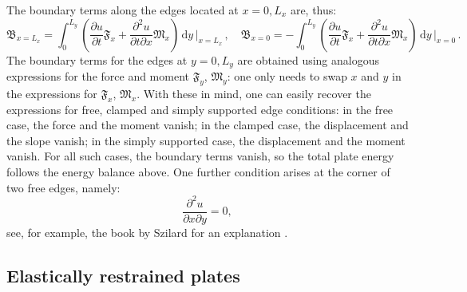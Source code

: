 The boundary terms along the edges located at $x=0,L_x$ are, thus:
\begin{equation}
    \mathfrak{B}_{x=L_x}= \int_{0}^{L_y}\left(\frac{\partial u}{\partial t}\mathfrak{F}_x + \frac{\partial^2 u}{\partial t\partial x}\mathfrak{M}_x\right)\,\mathrm{d}y\,\Big|_{x=L_x}\,,\quad
    \mathfrak{B}_{x=0}= -\int_{0}^{L_y}\left(\frac{\partial u}{\partial t}\mathfrak{F}_x + \frac{\partial^2 u}{\partial t\partial x}\mathfrak{M}_x\right)\,\mathrm{d}y\,\Big|_{x=0}\,.
\end{equation}
The boundary terms for the edges at $y = 0,L_y$ are obtained using analogous expressions for the force and moment ${\mathfrak F}_y$, ${\mathfrak M}_y$: one only needs to swap $x$ and $y$ in the expressions for ${\mathfrak F}_x$, ${\mathfrak M}_x$. With these in mind, one can easily recover the expressions for free, clamped and simply supported edge conditions: in the free case, the force and the moment vanish; in the clamped case, the displacement and the slope vanish; in the simply supported case, the displacement and the moment vanish. For all such cases, the boundary terms vanish, so the total plate energy follows the energy balance above. One further condition arises at the corner of two free edges, namely:
\begin{equation}\label{eq:CornerCnt}
\frac{\partial^2 u}{\partial x \partial y} = 0,
\end{equation}
see, for example, the book by Szilard for an explanation \cite{szilardBook}.


\subsection{Elastically restrained plates}

